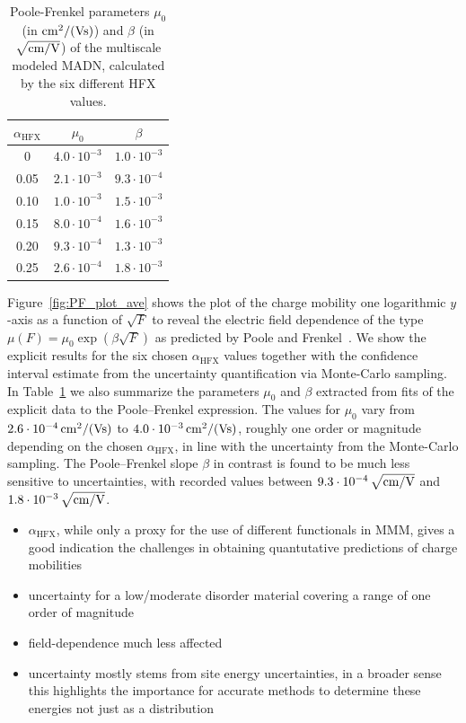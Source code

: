 \documentclass[%
 reprint,
superscriptaddress,
 amsmath,amssymb,
 aps,
prb,
floatfix
]{revtex4-2}
\newcommand{\bjoern}[2]{{\color{blue}{{\bf #1} #2}}}
\newcommand{\ahfx}{\ensuremath{\alpha_\text{HFX}}\xspace}
\begin{document}
\begin{table}[tbp]%
  \caption{\label{tab:PF_parameter}%
  Poole-Frenkel parameters $\mu_0$ (in $\unit[]{cm^2/(Vs)}$) and $\beta$ (in $\unit[]{\sqrt{cm/V}}$) of the multiscale modeled MADN, calculated by the six different HFX values. 
  }
  \begin{ruledtabular}
    \begin{tabular}{c c c}
    $\ahfx$ & $\mu_0$  & $\beta$ \\
      \hline
    0 & $4.0 \cdot 10^{-3}$ & $1.0 \cdot 10^{-3}$ \\
    0.05 & $2.1 \cdot 10^{-3}$ & $9.3 \cdot 10^{-4}$ \\
    0.10 & $1.0 \cdot 10^{-3}$ & $1.5 \cdot 10^{-3}$ \\
    0.15 & $8.0 \cdot 10^{-4}$ & $1.6 \cdot 10^{-3}$ \\
    0.20 & $9.3 \cdot 10^{-4}$ & $1.3 \cdot 10^{-3}$ \\
    0.25 & $2.6 \cdot 10^{-4}$ & $1.8 \cdot 10^{-3}$ \\
      \end{tabular}
  \end{ruledtabular}
  \end{table}


Figure~\ref{fig:PF_plot_ave} shows the plot of the charge mobility one logarithmic $y$-axis as a function of $\sqrt{F}$ to reveal the electric field dependence of the type $\mu(F)=\mu_0 \exp (\beta \sqrt{F})$ as predicted by Poole and Frenkel~\cite{frenkel_prebreakdown_1938}. We show the explicit results for the six chosen \ahfx values together with the confidence interval estimate from the uncertainty quantification via Monte-Carlo sampling. In Table~\ref{tab:PF_parameter} we also summarize the  parameters $\mu_0$ and $\beta$ extracted from fits of the explicit data to the Poole--Frenkel expression. The values for $\mu_0$ vary from $\unit[2.6\cdot 10^{-4}]{cm^2/(Vs)}$ to $\unit[4.0\cdot 10^{-3}]{cm^2/(Vs)}$, roughly one order or magnitude depending on the chosen \ahfx, in line with the uncertainty from the Monte-Carlo sampling. The Poole--Frenkel slope $\beta$ in contrast is found to be much less sensitive to uncertainties, with recorded values between $\unit[9.3\cdot 10^{-4}]{\sqrt{cm/V}}$ and $\unit[1.8\cdot 10^{-3}]{\sqrt{cm/V}}$.

\bjoern{STOP}{HERE}
\begin{itemize}
\item \ahfx, while only a proxy for the use of different functionals in MMM, gives a good indication the challenges in obtaining quantutative predictions of charge mobilities
\item uncertainty for a low/moderate disorder material covering a range of one order of magnitude 
\item field-dependence much less affected
\item uncertainty mostly stems from site energy uncertainties, in a broader sense this highlights the importance for accurate methods to determine these energies not just as a distribution
\end{itemize}
\end{document}
